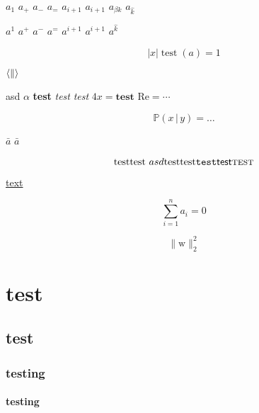 \documentclass{minimal}
\begin{document}
$a_1$
$a_+$
$a_-$
$a_=$
$a_{i + 1}$
$a_{i+1}$
$a_{\beta k}$
$a_{\hat k}$

$a^1$
$a^+$
$a^-$
$a^=$
$a^{i + 1}$
$a^{i+1}$
$a^{\hat k}$

\begin{equation}
  \bigl\lvert x \bigr\rvert
  \operatorname{test}(a) = 1
\end{equation}

$\langle \| \\ \rangle$

\textup{asd $\alpha$}
\textbf{test}
\textit{test}
\textsl{test}
$4 \mathit{x} = \mathbf{test}$
$\mathrm{Re} = \cdots$

\begin{equation}
  \mathbb{P}(x \,|\, y) \!= \dots
\end{equation}

$\bar a$
$\bar{a}$

\begin{equation}
  \text{test}
  \textnormal{test $asd$}
  \textrm{test}
  \textup{test}
  \texttt{test}
  \textsf{test}
  \textsc{test}
\end{equation}

\href{url}{text}


\begin{equation}
  \sum_{i=1}^n a_i = 0
\end{equation}

$$\lVert \mathrm{w} \rVert_2^2$$

\chapter{test}

\section{test}

\subsection{testing}

\subsubsection{testing}
\end{document}
